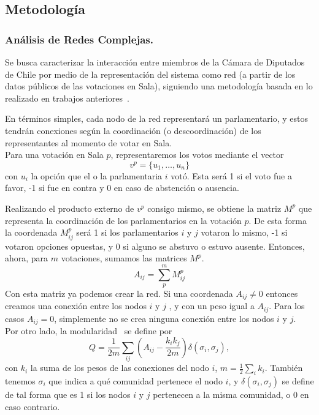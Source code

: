 \documentclass[hyperref]{proyectotesis}
\begin{document}
\subsection{Metodología}
\subsubsection{Análisis de Redes Complejas.}
Se busca caracterizar la interacción entre miembros de la Cámara de Diputados de Chile por medio de la representación del sistema como red (a partir de los datos públicos de las votaciones en Sala), siguiendo una metodología basada en lo realizado en trabajos anteriores~\cite{andris_rise_2015, marenco_time_2020, schoch_legislators_2020, intal_dissent_2021}. 

En términos simples, cada nodo de la red representará un parlamentario, y estos tendrán conexiones según la coordinación (o descoordinación) de los representantes al momento de votar en Sala.\\

Para una votación en Sala $p$, representaremos los votos mediante el vector 
\begin{equation}
    v^p = \{u_1,\dots,u_n\}
\end{equation}
con $u_i$ la opción que el o la parlamentaria $i$ votó. Esta será 1 si el voto fue a favor, -1 si fue en contra y 0 en caso de abstención o ausencia.

Realizando el producto externo de $v^p$ consigo mismo, se obtiene la matriz $M^p$ que representa la coordinación de los parlamentarios en la votación $p$. De esta forma la coordenada $M^p_{ij}$ será 1 si los parlamentarios $i$ y $j$ votaron lo mismo, -1 si votaron opciones opuestas, y 0 si alguno se abstuvo o estuvo ausente. Entonces, ahora, para $m$ votaciones, sumamos las matrices $M^p$.
\begin{equation}
    A_{ij} = \sum_p^m M^p_{ij} \label{adj}
\end{equation}
Con esta matriz ya podemos crear la red. Si una coordenada $A_{ij}\neq 0$ entonces creamos una conexión entre los nodos $i$ y $j$ , y con un peso igual a $A_{ij}$. Para los casos $A_{ij} = 0$, simplemente no se crea ninguna conexión entre los nodos $i$ y $j$.\\

Por otro lado, la modularidad~\cite{newman_finding_2004} se define por
\begin{equation}
    Q = \frac{1}{2m}\sum_{ij} \left( A_{ij} - \frac{k_i k_j}{2m}  \right) \delta(\sigma_i,\sigma_j) \label{mod}
,\end{equation}
con $k_i$ la suma de los pesos de las conexiones del nodo $i$, $m = \frac{1}{2} \sum_i k_i$. También tenemos $\sigma_i$ que indica a qué comunidad pertenece el nodo $i$, y $\delta(\sigma_i,\sigma_j)$ se define de tal forma que es 1 si los nodos $i$ y $j$ pertenecen a la misma comunidad, o 0 en caso contrario.\\
\end{document}
